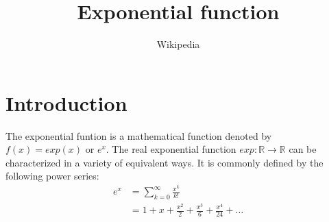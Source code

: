 \documentclass[twocolumn, a4paper]{article}
\begin{document}
\title{Exponential function}
\author{Wikipedia}
\maketitle
\section*{Introduction}
The exponential funtion is a mathematical function denoted by $f(x)=\textit{exp}(x)$ or $\textit{e}^x$. The real exponential function $\textit{exp}: \mathbb{R} \rightarrow \mathbb{R}$ can be characterized in a variety of equivalent ways. It is commonly defined by the following power series:
\begin{align}\label{exp-def}
	\textit{e}^x &=\sum_{k=0}^{\infty} \frac{x^k}{k!} \\
	&= 1 + x + \frac{x^2}{2} + \frac{x^3}{6} + \frac{x^4}{24} + \dots
\end{align}
\end{document}
